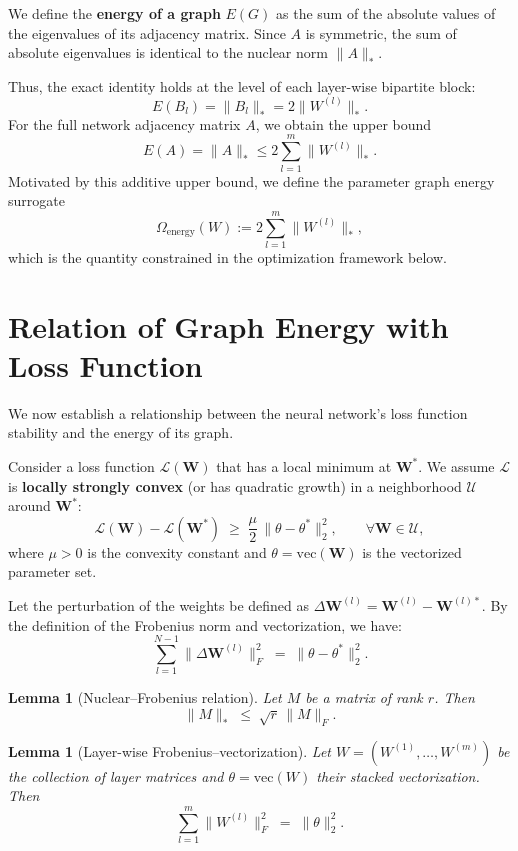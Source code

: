 \documentclass[a4paper,fleqn]{cas-sc}
\newtheorem{lemma}[theorem]{Lemma}
\theoremstyle{remark}
\theoremstyle{definition}
\begin{document}
We define the \textbf{energy of a graph} $E(G)$ as the sum of the absolute values of the eigenvalues of its adjacency matrix. Since $A$ is symmetric, the sum of absolute eigenvalues is identical to the nuclear norm $\|A\|_*$.

Thus, the exact identity holds at the level of each layer-wise bipartite block:
\[
E(B_l)=\|B_l\|_*=2\|W^{(l)}\|_*.
\]
For the full network adjacency matrix $A$, we obtain the upper bound
\[
E(A)=\|A\|_* \le 2\sum_{l=1}^{m}\|W^{(l)}\|_*.
\]
Motivated by this additive upper bound, we define the parameter graph energy surrogate
\[
\Omega_{\text{energy}}(W):=2\sum_{l=1}^{m}\|W^{(l)}\|_*,
\]
which is the quantity constrained in the optimization framework below.
%
\section{Relation of Graph Energy with Loss Function}\label{sec:relation}

We now establish a relationship between the neural network's loss function stability and the energy of its graph. 

Consider a loss function $\mathcal{L}(\bm{W})$ that has a local minimum at $\bm{W}^*$. We assume $\mathcal{L}$ is \textbf{locally strongly convex} (or has quadratic growth) in a neighborhood $\mathcal{U}$ around $\bm{W}^*$:
\begin{equation}\label{h1}
\mathcal{L}(\bm{W})-\mathcal{L}(\bm{W}^*) \;\ge\; \frac{\mu}{2}\,\|\theta-\theta^*\|_2^2,\qquad \forall \bm{W}\in\mathcal{U},
\end{equation}
where $\mu>0$ is the convexity constant and $\theta = \mathrm{vec}(\bm{W})$ is the vectorized parameter set.

Let the perturbation of the weights be defined as $\Delta \bm{W}^{(l)} = \bm{W}^{(l)} - \bm{W}^{(l)*}$. By the definition of the Frobenius norm and vectorization, we have:
\begin{equation}\label{eq_f_v}
\sum_{l=1}^{N-1} \|\Delta \bm{W}^{(l)}\|_F^2 \;=\; \|\theta-\theta^*\|_2^2.
\end{equation}

\begin{lemma}[Nuclear--Frobenius relation]\label{lem:nuclear-fro}
Let $M$ be a matrix of rank $r$. Then
\[
\|M\|_* \;\le\; \sqrt{r}\,\|M\|_F.
\]
\end{lemma}

\begin{lemma}[Layer-wise Frobenius--vectorization]\label{lem:fro-stack}
Let $W=(W^{(1)},\dots,W^{(m)})$ be the collection of layer matrices and $\theta = \mathrm{vec}(W)$ their stacked vectorization. Then
\[
\sum_{l=1}^m \|W^{(l)}\|_F^2 \;=\; \|\theta\|_2^2.
\]
\end{lemma}
\end{document}
